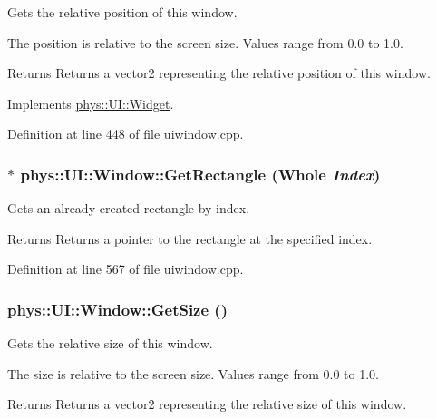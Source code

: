 Gets the relative position of this window. 

The position is relative to the screen size. Values range from 0.0 to 1.0. \begin{DoxyReturn}{Returns}
Returns a vector2 representing the relative position of this window. 
\end{DoxyReturn}


Implements \hyperlink{classphys_1_1UI_1_1Widget_a3e464b028b0d1b5755923b8790260c33}{phys::UI::Widget}.



Definition at line 448 of file uiwindow.cpp.

\hypertarget{classphys_1_1UI_1_1Window_adb076e699dd41c27cb4e60711711fc77}{
\subsubsection[{GetRectangle}]{ $\ast$ phys::UI::Window::GetRectangle ({\bf Whole} {\em Index})}}
\label{d4/d86/classphys_1_1UI_1_1Window_adb076e699dd41c27cb4e60711711fc77}


Gets an already created rectangle by index. 

\begin{DoxyReturn}{Returns}
Returns a pointer to the rectangle at the specified index. 
\end{DoxyReturn}


Definition at line 567 of file uiwindow.cpp.

\hypertarget{classphys_1_1UI_1_1Window_a9946100eb6e6e985921bbea9e87cede3}{
\subsubsection[{GetSize}]{ phys::UI::Window::GetSize ()}}
\label{d4/d86/classphys_1_1UI_1_1Window_a9946100eb6e6e985921bbea9e87cede3}


Gets the relative size of this window. 

The size is relative to the screen size. Values range from 0.0 to 1.0. \begin{DoxyReturn}{Returns}
Returns a vector2 representing the relative size of this window. 
\end{DoxyReturn}


